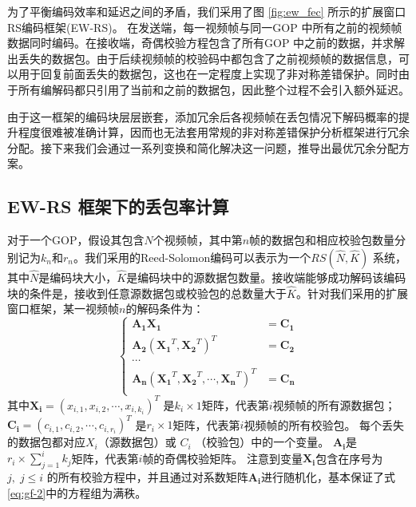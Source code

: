 为了平衡编码效率和延迟之间的矛盾，我们采用了图 \ref{fig:ew_fec} 所示的扩展窗口RS编码框架(EW-RS)。 在发送端，每一视频帧与同一GOP 中所有之前的视频帧数据同时编码。在接收端，奇偶校验方程包含了所有GOP 中之前的数据，并求解出丢失的数据包。由于后续视频帧的校验码中都包含了之前视频帧的数据信息，可以用于回复前面丢失的数据包，这也在一定程度上实现了非对称差错保护。同时由于所有编解码都只引用了当前和之前的数据包，因此整个过程不会引入额外延迟。

由于这一框架的编码块层层嵌套，添加冗余后各视频帧在丢包情况下解码概率的提升程度很难被准确计算，因而也无法套用常规的非对称差错保护分析框架进行冗余分配。接下来我们会通过一系列变换和简化解决这一问题，推导出最优冗余分配方案。

    \subsection{EW-RS 框架下的丢包率计算}
    对于一个GOP，假设其包含$N$个视频帧，其中第$n$帧的数据包和相应校验包数量分别记为$k_n$和$r_n$。我们采用的Reed-Solomon编码可以表示为一个$RS(\hat{N},\hat{K})$ \cite{wicker1999reed} 系统，其中$\hat{N}$是编码块大小，$\hat{K}$是编码块中的源数据包数量。接收端能够成功解码该编码块的条件是，接收到任意源数据包或校验包的总数量大于$\hat{K}$。针对我们采用的扩展窗口框架，某一视频帧$n$的解码条件为：
    \begin{equation}\label{eq:gf-2}
      \left\{ \begin{array}{ll}
        \mathbf{A_{1}}\mathbf{X_1} &= \mathbf{C_1}\\
        \mathbf{A_{2}}(\mathbf{X_1}^T, \mathbf{X_2}^T)^T&= \mathbf{C_2}\\
        \cdots\\
        \mathbf{A_{n}}(\mathbf{X_1}^T,\mathbf{X_2}^T,\cdots,\mathbf{X_{n}}^T)^T &= \mathbf{C_{n}}\\
      \end{array} \right.
    \end{equation}
    其中$\mathbf{X_i}=(x_{i,1},x_{i,2},\cdots,x_{i,k_i})^T$ 是$k_i \times 1$矩阵，代表第$i$视频帧的所有源数据包；$\mathbf{C_i}=(c_{i,1},c_{i,2},\cdots,c_{i,r_i})^T$ 是$r_i \times 1$矩阵，代表第$i$视频帧的所有校验包。
    每个丢失的数据包都对应$X_i$（源数据包）或 $C_i$ （校验包）中的一个变量。
    $\mathbf{A_i}$是$r_i \times \sum_{j=1}^{i}k_j$矩阵，代表第$i$帧的奇偶校验矩阵。
    注意到变量$\mathbf{X_i}$包含在序号为$j,\; j \le i$ 的所有校验方程中，并且通过对系数矩阵$\mathbf{A_{i}}$进行随机化，基本保证了式\ref{eq:gf-2}中的方程组为满秩\cite{xiao2013real}。


